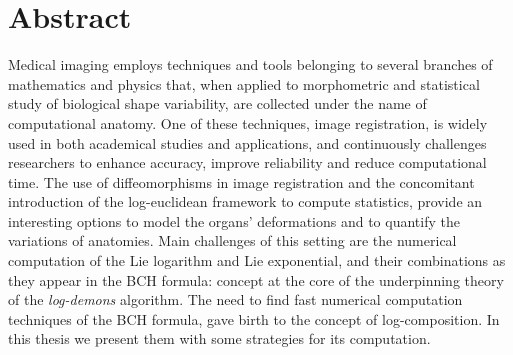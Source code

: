 
\qquad
\pagestyle{empty}
\newpage


\section*{Abstract}

Medical imaging employs techniques and tools belonging to several branches of mathematics and physics that, when applied to morphometric and statistical study of biological shape variability, are collected under the name of computational anatomy. 
One of these techniques, image registration, is widely used in both academical studies and applications, and continuously challenges researchers to enhance accuracy, improve reliability and reduce computational time. The use of diffeomorphisms in image registration and the concomitant introduction of the log-euclidean framework to compute statistics, provide an interesting options to model the organs' deformations and to quantify the variations of anatomies.
Main challenges of this setting are the numerical computation of the Lie logarithm and Lie exponential, and their combinations as they appear in the BCH formula: concept at the core of the underpinning theory of the \emph{log-demons} algorithm.
The need to find fast numerical computation techniques of the BCH formula, gave birth to the concept of log-composition. In this thesis we present them with some strategies for its computation.


